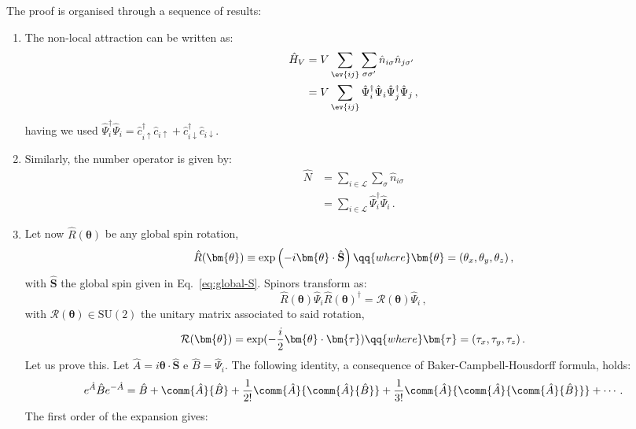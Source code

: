 \begin{tabproof}[Proof of Eq.~\eqref{eq:[HV,S]=0-[N,S]=0}: $\hat H_V$ and $\hat N$ are $\mathrm{SU}(2)$ symmetric.]
	
	The proof is organised through a sequence of results:	
	\begin{enumerate}
		\item The non-local attraction can be written as:
		\begin{align}
			\hat H_V &= V\sum_{\ev{ij}} \sum_{\sigma\sigma'} \hat n_{i\sigma} \hat n_{j\sigma'} \nonumber \\
			&= V\sum_{\ev{ij}} \hat \Psi_i^\dagger \hat \Psi_i \hat \Psi_j^\dagger \hat \Psi_j \, , \label{eq:ehm-HV-4xPsi}
		\end{align}
		having we used $\hat \Psi_i^\dagger \hat \Psi_i = \hat c_{i\uparrow}^\dagger \hat c_{i\uparrow} + \hat c_{i\downarrow}^\dagger \hat c_{i\downarrow}$.
		\item Similarly, the number operator is given by:
		\begin{align}
			\hat N &= \sum_{i \in \mathcal{L}} \sum_{\sigma} \hat n_{i\sigma} \nonumber \\
			&= \sum_{i \in \mathcal{L}} \hat \Psi_i^\dagger \hat \Psi_i \label{eq:ehm-N-2xPsi} \, .
		\end{align}
		\item Let now $\hat R(\bm{\theta})$ be any global spin rotation,
		\[
			\hat R (\bm{\theta}) \equiv \exp \left(-i \bm{\theta} \cdot \hat{\mathbf{S}}\right)
			\qq{where}
			\bm{\theta} = (\theta_x,\theta_y,\theta_z) \, ,
		\]
		with $\hat {\mathbf{S}}$ the global spin given in Eq.~\eqref{eq:global-S}. Spinors transform as:
		\[
			\hat R (\bm{\theta}) \hat \Psi_i \hat R (\bm{\theta})^\dagger = \mathcal{R}(\bm{\theta}) \hat \Psi_i \, ,
		\]
		with $\mathcal{R}(\bm{\theta}) \in \mathrm{SU}(2)$ the unitary matrix associated to said rotation,
		\begin{equation}\label{eq:ehm-R-exp}
			\mathcal{R}(\bm{\theta}) = \exp(- \frac{i}{2} \bm{\theta} \cdot \bm{\tau})
			\qq{where}
			\bm{\tau} = (\tau_x,\tau_y,\tau_z) \, .
		\end{equation}
		Let us prove this. Let $\hat A = i \bm{\theta} \cdot \hat{\mathbf{S}}$ e $\hat B = \hat \Psi_i$. The following identity, a consequence of Baker-Campbell-Housdorff formula, holds:
		\[
			e^{\hat A} \hat B e^{-\hat A} = \hat B + \comm{\hat A}{\hat B} + \frac{1}{2!} \comm{\hat A}{ \comm{\hat A}{\hat B}} + \frac{1}{3!} \comm{\hat A}{\comm{\hat A}{\comm{\hat A}{\hat B}}} + \cdots \, .
		\]
		The first order of the expansion gives:

\end{enumerate}
\end{tabproof}
